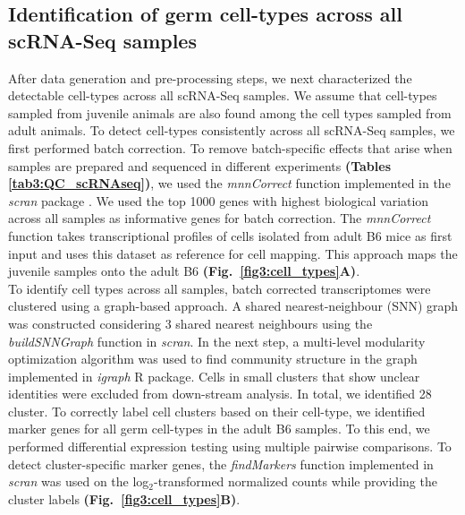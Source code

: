 \newpage

\subsection{Identification of germ cell-types across all scRNA-Seq samples}
\label{sec3:clustering}

After data generation and pre-processing steps, we next characterized the detectable cell-types across all scRNA-Seq samples. We assume that cell-types sampled from juvenile animals are also found among the cell types sampled from adult animals. To detect cell-types consistently across all scRNA-Seq samples, we first performed batch correction. To remove batch-specific effects that arise when samples are prepared and sequenced in different experiments \textbf{(Tables \ref{tab3:QC_scRNAseq})}, we used the \emph{mnnCorrect} function implemented in the \emph{scran} package \citep{Haghverdi2018}. We used the top 1000 genes with highest biological variation across all samples as informative genes for batch correction. The \emph{mnnCorrect} function takes transcriptional profiles of cells isolated from adult B6 mice as first input and uses this dataset as reference for cell mapping. This approach maps the juvenile samples onto the adult B6 \textbf{(Fig.~\ref{fig3:cell_types}A)}.\\

To identify cell types across all samples, batch corrected transcriptomes were clustered using a graph-based approach. A shared nearest-neighbour (SNN) graph \citep{Xu2015} was constructed considering 3 shared nearest neighbours using the \emph{buildSNNGraph} function in \emph{scran}. In the next step, a multi-level modularity optimization algorithm was used to find community structure in the graph \citep{Blondel2008} implemented in \emph{igraph} R package. Cells in small clusters that show unclear identities were excluded from down-stream analysis. In total, we identified 28 cluster. To correctly label cell clusters based on their cell-type, we identified marker genes for all germ cell-types in the adult B6 samples. To this end, we performed differential expression testing using multiple pairwise comparisons. To detect cluster-specific marker genes, the \emph{findMarkers} function implemented in \emph{scran} was used on the log$_2$-transformed normalized counts while providing the cluster labels \textbf{(Fig.~\ref{fig3:cell_types}B)}. \\

